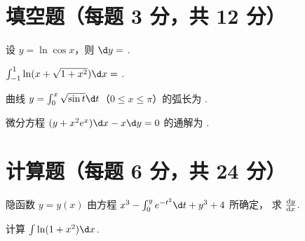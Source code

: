 \documentclass[quiet]{ctexart}
\begin{document}
\section{填空题（每题 3 分，共 12 分）}

\begin{problem}
  设 $y = \ln \cos x$，则 $\d y =$ \result{}.
\end{problem}
\begin{solution}
  
\end{solution}

\begin{problem}
  $\int_{-1}^1 \ln (x + \sqrt{1 + x^2}) \d x =$ \result{}.
\end{problem}
\begin{solution}
  
\end{solution}

\begin{problem}
  曲线 $y = \int_0^x \sqrt{\sin t} \d t$（$0 \leq x \leq \pi$）的弧长为 \result{}.
\end{problem}
\begin{solution}
  
\end{solution}

\begin{problem}
  微分方程 $(y + x^2 e^x) \d x - x \d y = 0$ 的通解为 \result{}.
\end{problem}
\begin{solution}
  
\end{solution}

\section{计算题（每题 6 分，共 24 分）}

\begin{problem}
  隐函数 $y = y(x)$ 由方程 $x^3 - \int_0^y e^{-t^2} \d t + y^3 + 4$ 所确定，
  求 $\odv yx$.
\end{problem}
\begin{solution}
  
\end{solution}

\begin{problem}
  计算 $\int \ln (1 + x^2) \d x$.
\end{problem}
\begin{solution}
  
\end{solution}
\end{document}
